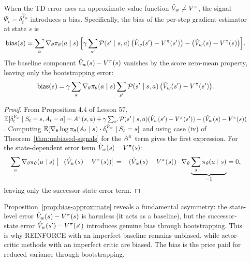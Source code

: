 \documentclass[11pt,a4paper]{article}
\begin{document}
\begin{proposition}
\label{prop:bias-approximate}
When the TD error uses an approximate value function
$\hat{V}_w \neq V^{\pi}$, the signal $\Psi_t = \delta_t^{\hat{V}_w}$
introduces a bias. Specifically, the bias of the per-step gradient
estimator at state $s$ is
\[
  \mathrm{bias}(s) = \sum_a \nabla_\theta \pi_\theta(a \mid s)\,
  \Bigl[\gamma \sum_{s'} \mathcal{P}(s' \mid s, a)\,
  \bigl(\hat{V}_w(s') - V^{\pi}(s')\bigr)
  - \bigl(\hat{V}_w(s) - V^{\pi}(s)\bigr)\Bigr].
\]
The baseline component $\hat{V}_w(s) - V^{\pi}(s)$ vanishes by the
score zero-mean property, leaving only the bootstrapping error:
\[
  \mathrm{bias}(s) = \gamma \sum_a \nabla_\theta
  \pi_\theta(a \mid s) \sum_{s'} \mathcal{P}(s' \mid s, a)\,
  \bigl(\hat{V}_w(s') - V^{\pi}(s')\bigr).
\]
\end{proposition}

\begin{proof}
From Proposition 4.4 of Lesson 57, $\mathbb{E}[\delta_t^{\hat{V}_w} \mid
S_t = s, A_t = a] = A^\pi(s,a) + \gamma \sum_{s'}
\mathcal{P}(s' \mid s,a)(\hat{V}_w(s') - V^{\pi}(s')) - (\hat{V}_w(s) - V^{\pi}(s))$.
Computing $\mathbb{E}[\nabla_\theta \log \pi_\theta(A_t \mid s) \cdot
\delta_t^{\hat{V}_w} \mid S_t = s]$ and using case (iv) of
Theorem~\ref{thm:unbiased-signals} for the $A^\pi$ term gives the
first expression. For the state-dependent error term
$\hat{V}_w(s) - V^{\pi}(s)$:
\[
  \sum_a \nabla_\theta \pi_\theta(a \mid s)\,
  \bigl[-(\hat{V}_w(s) - V^{\pi}(s))\bigr]
  = -(\hat{V}_w(s) - V^{\pi}(s)) \cdot \nabla_\theta
  \underbrace{\sum_a \pi_\theta(a \mid s)}_{=1} = 0,
\]
leaving only the successor-state error term.
\end{proof}

\begin{rlconnection}
Proposition~\ref{prop:bias-approximate} reveals a fundamental asymmetry:
the state-level error $\hat{V}_w(s) - V^{\pi}(s)$ is harmless (it acts
as a baseline), but the successor-state error
$\hat{V}_w(s') - V^{\pi}(s')$ introduces genuine bias through
bootstrapping. This is why REINFORCE with an imperfect baseline
remains unbiased, while actor-critic methods with an imperfect critic
are biased. The bias is the price paid for reduced variance through
bootstrapping.
\end{rlconnection}

\end{document}
